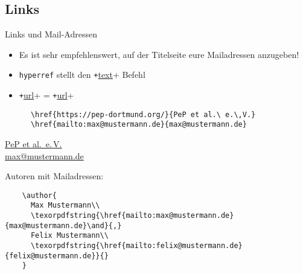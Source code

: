 \subsection{Links}
\begin{frame}[fragile]{Links und Mail-Adressen}
  \begin{itemize}
    \item Es ist sehr empfehlenswert, auf der Titelseite eure Mailadressen anzugeben!
    \item \texttt{hyperref} stellt den \texttt+\href{link}{text}+ Befehl
    \item \texttt+\url{url}+ = \texttt+\href{url}{url}+
  \end{itemize}
  \vspace{-0.6em}
  \begin{CodeExample}{0.75}
    \begin{verbatim}
      \href{https://pep-dortmund.org/}{PeP et al.\ e.\,V.}
      \href{mailto:max@mustermann.de}{max@mustermann.de}
    \end{verbatim}
  \CodeResult
    \strut
    \href{https://pep-dortmund.org/}{PeP et al.\ e.\,V.}\\
    \href{mailto:max@mustermann.de}{max@mustermann.de}
  \end{CodeExample}
  \begin{block}{Autoren mit Mailadressen:}
    \begin{verbatim}
    \author{
      Max Mustermann\\
      \texorpdfstring{\href{mailto:max@mustermann.de}{max@mustermann.de}\and}{,}
      Felix Mustermann\\
      \texorpdfstring{\href{mailto:felix@mustermann.de}{felix@mustermann.de}}{}
    }
    \end{verbatim}
  \end{block}
\end{frame}

